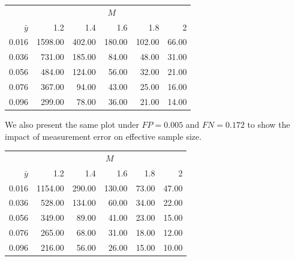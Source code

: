 \documentclass[12pt]{article}
\begin{document}
\begin{table}[ht]
\centering
\begin{tabular}{rrrrrr}
& \multicolumn{5}{c}{$M$} \\ \cline{2-6}
$\bar y$ & 1.2 & 1.4 & 1.6 & 1.8 & 2 \\
  \hline
0.016 & 1598.00 & 402.00 & 180.00 & 102.00 & 66.00 \\
  0.036 & 731.00 & 185.00 & 84.00 & 48.00 & 31.00 \\
  0.056 & 484.00 & 124.00 & 56.00 & 32.00 & 21.00 \\
  0.076 & 367.00 & 94.00 & 43.00 & 25.00 & 16.00 \\
  0.096 & 299.00 & 78.00 & 36.00 & 21.00 & 14.00 \\
   \hline
\end{tabular}
\end{table}


We also present the same plot under $FP = 0.005$ and $FN = 0.172$ to show the impact of measurement error on effective sample size.

\begin{table}[ht]
\centering
\begin{tabular}{rrrrrr}
  & \multicolumn{5}{c}{$M$} \\ \cline{2-6}
$\bar y$ & 1.2 & 1.4 & 1.6 & 1.8 & 2 \\
  \hline
0.016 & 1154.00 & 290.00 & 130.00 & 73.00 & 47.00 \\
  0.036 & 528.00 & 134.00 & 60.00 & 34.00 & 22.00 \\
  0.056 & 349.00 & 89.00 & 41.00 & 23.00 & 15.00 \\
  0.076 & 265.00 & 68.00 & 31.00 & 18.00 & 12.00 \\
  0.096 & 216.00 & 56.00 & 26.00 & 15.00 & 10.00 \\
   \hline
\end{tabular}
\end{table}







\end{document}
